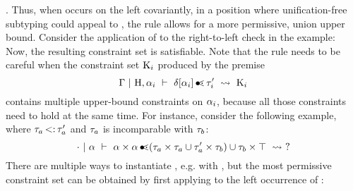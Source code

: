 \tyunion{\tyint}{\tyflt}.
Thus, when \va occurs on the left covariantly, in a position where 
unification-free subtyping could appeal to ,
the rule  allows for a more permissive, union upper bound.
Consider the application of  to the right-to-left check
in the example:\\
Now, the resulting constraint set
\ctrset{\ctrsub{\va}{\tyunion\tyint\tyflt}, 
\ctrsub{\tyint}{\va}, \ctrsub{\tyflt}{\va}}
is satisfiable.
Note that the rule  needs to be careful when 
the constraint set $\mathrm{K}_i$ produced by the premise
\[\Gamma~\vert~\mathrm{H},\alpha_i\ \vdash\ \delta[\alpha_i] \operatorname{\bullet\!\!\lessdot} \tau'_i\ \rightsquigarrow\ \mathrm{K}_i\]
contains multiple upper-bound constraints on $\alpha_i$, because all those
constraints need to hold at the same time.
For instance, consider the following example,
where $\tau_a \operatorname{<:} \tau'_a$ and $\tau_a$ is incomparable with $\tau_b$:
\[
    \cdot~\vert~\alpha\ \vdash\ \alpha \times \alpha \operatorname{\bullet\!\!\lessdot} (\tau_a \times \tau_a \cup \tau'_a \times \tau_b) \cup \tau_b \times \top\ \rightsquigarrow\  ? 
\]
There are multiple ways to instantiate \va, e.g. with \tybot,
but the most permissive constraint set can be obtained by first
applying  to the left occurrence of \va:\\
